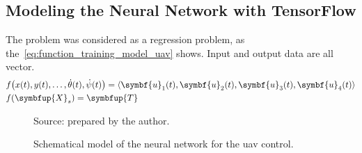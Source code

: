 \subsection{Modeling the Neural Network with TensorFlow}

The problem was considered as a regression problem, as the~\cref{eq:function_training_model_uav} shows. Input and output data are all vector.
%
\begin{subequations}\label{eq:function_training_model_uav}
    \begin{align}
        &f\big(x(t),y(t),\ldots,\dot{\theta}(t),\dot{\psi}(t)\big) = \langle \symbf{u}_1(t),\symbf{u}_2(t),\symbf{u}_3(t),\symbf{u}_4(t) \rangle \\
        &f(\symbfup{X}_s) = \symbfup{T}
    \end{align}
\end{subequations}

\begin{figure}[!htb]
    \centering
    \caption{Schematical model of the neural network for the \gls*{uav} control.}
    

    {\footnotesize Source: prepared by the author.}
\end{figure}